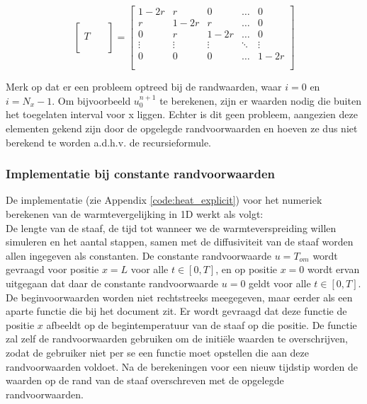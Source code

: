 \documentclass[a4paper,kulak]{kulakarticle} %
\begin{document}
\begin{equation}
	\begin{bmatrix}
		\qquad \\
		T \\
		\\ 
	\end{bmatrix}
	=
	\begin{bmatrix}
		1-2r	&	r		&	0		&	\dots	&	0 		\\
		r		&	1-2r	&	r		&	\dots	&	0		\\
		0		&	r		&	1-2r	&	\dots	&	0		\\
		\vdots	&	\vdots	&	\vdots	&	\ddots	&	\vdots	\\
		0		&	0		&	0		&	\dots	&	1-2r	\\
		\\ 
	\end{bmatrix}
\end{equation}

Merk op dat er een probleem optreed bij de randwaarden, waar $i = 0$ en $i = N_x-1$. Om bijvoorbeeld $u_0^{n+1}$ te berekenen, zijn er waarden nodig die buiten het toegelaten interval voor x liggen. Echter is dit geen probleem, aangezien deze elementen gekend zijn door de opgelegde randvoorwaarden en hoeven ze dus niet berekend te worden a.d.h.v. de recursieformule.

\subsubsection{Implementatie bij constante randvoorwaarden}
\label{sec:implementatie_expliciet_constant}

De implementatie  (zie Appendix \ref{code:heat_explicit}) voor het numeriek berekenen van de warmtevergelijking in 1D werkt als volgt: \\
De lengte van de staaf, de tijd tot wanneer we de warmteverspreiding willen simuleren en het aantal stappen, samen met de diffusiviteit van de staaf worden allen ingegeven als constanten. De constante randvoorwaarde $u = T_{om}$ wordt gevraagd voor positie $x = L$ voor alle $t \in [0, T]$, en op positie $x = 0$ wordt ervan uitgegaan dat daar de constante randvoorwaarde $u = 0$ geldt voor alle $t \in [0, T]$. De beginvoorwaarden worden niet rechtstreeks meegegeven, maar eerder als een aparte functie  die bij het document zit. Er wordt gevraagd dat deze functie de positie $x$ afbeeldt op de begintemperatuur van de staaf op die positie. De functie  zal zelf de randvoorwaarden gebruiken om de initiële waarden te overschrijven, zodat de gebruiker niet per se een functie moet opstellen die aan deze randvoorwaarden voldoet. Na de berekeningen voor een nieuw tijdstip worden de waarden op de rand van de staaf overschreven met de opgelegde randvoorwaarden.
\end{document}
